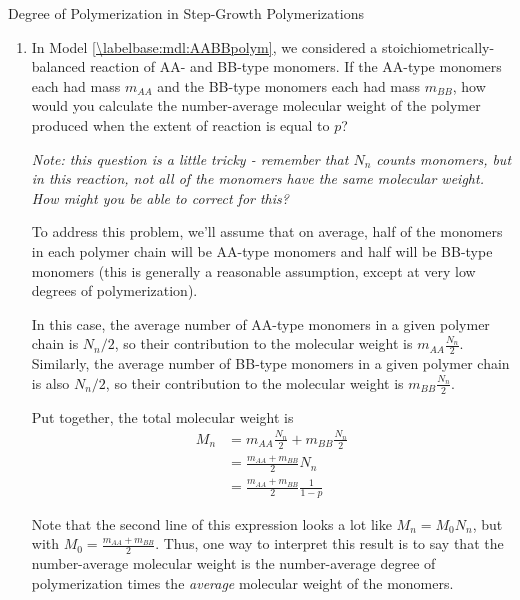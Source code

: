 \begin{activity}{Degree of Polymerization in Step-Growth Polymerizations}
\begin{exercises}
\begin{enumerate}
\begin{solution}{}
						Here, the molecular weight of the monomer is $m_{AB}$, so
						\begin{equation*}
							M_n = m_{AB} N_n = \frac{m_{AB}}{1-p}
						\end{equation*}
					\end{solution}
				
				\item In Model \ref{\labelbase:mdl:AABBpolym}, we considered a stoichiometrically-balanced reaction of AA- and BB-type monomers. If the AA-type monomers each had mass $m_{AA}$ and the BB-type monomers each had mass $m_{BB}$, how would you calculate the number-average molecular weight of the polymer produced when the extent of reaction is equal to $p$?
				
					\emph{Note: this question is a little tricky - remember that $N_n$ counts \emph{monomers}, but in this reaction, not all of the monomers have the same molecular weight.  How might you be able to correct for this?}
					
					\begin{solution}{}
						To address this problem, we'll assume that on average, half of the monomers in each polymer chain will be AA-type monomers and half will be BB-type monomers (this is generally a reasonable assumption, except at very low degrees of polymerization).
						
						In this case, the average number of AA-type monomers in a given polymer chain is $N_n/2$, so their contribution to the molecular weight is $m_{AA}\frac{N_n}{2}$.  Similarly, the average number of BB-type monomers in a given polymer chain is also $N_n/2$, so their contribution to the molecular weight is $m_{BB}\frac{N_n}{2}$.
						
						Put together, the total molecular weight is
						\begin{align*}
							M_n &= m_{AA}\frac{N_n}{2} + m_{BB}\frac{N_n}{2}\\
								&= \frac{m_{AA} + m_{BB}}{2} N_n\\
								&= \frac{m_{AA} + m_{BB}}{2} \frac{1}{1-p}
						\end{align*}
						
						Note that the second line of this expression looks a lot like $M_n = M_0 N_n$, but with $M_0 = \frac{m_{AA} + m_{BB}}{2}$.  Thus, one way to interpret this result is to say that the number-average molecular weight is the number-average degree of polymerization times the \emph{average} molecular weight of the monomers.
					\end{solution}
				

\end{enumerate}
\end{exercises}
\end{activity}
